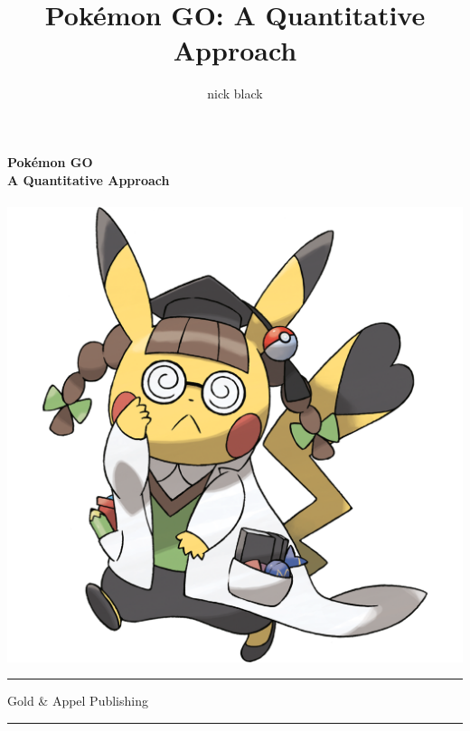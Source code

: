 \documentclass[ebook,10pt,openany,oneside]{memoir}
\title{Pokémon GO: A Quantitative Approach}
\author{nick black}
\def\LOGO {
  \textbf{
    \Huge Pokémon GO\\
    \Large A Quantitative Approach\\
  }}
\begin{document}
  \pagestyle{empty}
  \begin{center}
  \LOGO
  \bigskip
  \\
  \vspace{3cm}
  \includegraphics[width=.75\pagewidth,keepaspectratio]{images/pikachuphd.png}
  \end{center}
  \vfill\hrule
  \begin{center}\textsf{Gold \& Appel Publishing}\end{center}
  \hrule
  \clearpage
  \setcounter{page}{1}
  \pagestyle{plain} %

\clearpage
\ifdefined\epub
\else
  \hypertarget{toc}{}%
  \tableofcontents*
  \hypertarget{lot}{}%
  \listoftables*
  \fi

\mainmatter















\appendix

\end{document}
